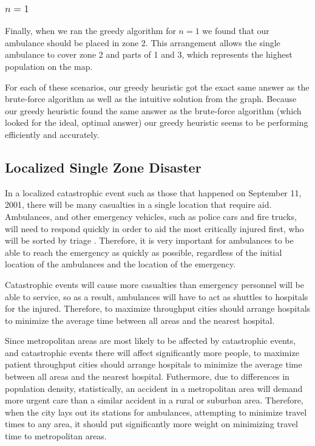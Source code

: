 \documentclass[notitlepage, 12pt]{article}
\begin{document}
\subsubsection{$n=1$}
Finally, when we ran the greedy algorithm for $n=1$ we found that our ambulance should be placed in zone 2. This arrangement allows the single ambulance to cover zone 2 and parts of 1 and 3, which represents the highest population on the map.

For each of these scenarios, our greedy heuristic got the exact same answer as the
brute-force algorithm as well as the intuitive solution from the graph. Because our greedy heuristic found the same answer as the brute-force algorithm (which looked for the ideal, optimal answer) our greedy heuristic seems to be performing efficiently and accurately.

\subsection{Localized Single Zone Disaster}
In a localized catastrophic event such as those that happened on September 11, 2001, there will be
many casualties in a single location that require aid. Ambulances, and other emergency vehicles,
such as police cars and fire trucks, will need to respond quickly in order to aid the most critically
injured first, who will be sorted by triage \cite{ColRev}. Therefore, it is very important for ambulances to be able to
reach the emergency as quickly as possible, regardless of the initial location of the ambulances and the
location of the emergency.

Catastrophic events will cause more casualties than emergency personnel will be able to service, so as a result,
ambulances will have to act as shuttles to hospitals for the injured. Therefore, to maximize throughput
cities should arrange hospitals to minimize the average time between all areas and the nearest
hospital.

Since metropolitan areas are most likely to be affected by catastrophic events, and catastrophic events there
will affect significantly more people, to maximize patient throughput cities should arrange hospitals to minimize
the average time between all areas and the nearest hospital. Futhermore, due to differences in population density,
statistically, an accident in a metropolitan area will demand more urgent care than a similar accident
in a rural or suburban area. Therefore, when the city lays out its stations for ambulances, attempting to minimize
travel times to any area, it should put significantly more weight on minimizing travel time to metropolitan areas.
\end{document}

